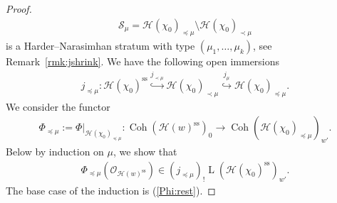 \documentclass[11pt,oneside,a4paper,mathscr]{amsart}
\theoremstyle{definition}
\newcommand{\LL}{\operatorname{L}}
\newcommand{\cH}{\mathcal{H}}
\newcommand{\Coh}{\operatorname{Coh}}
\begin{document}
\begin{proof}
\begin{align*}
    \mathcal{S}_{\mu}=\cH(\chi_0)_{\preceq \mu}\setminus \cH(\chi_0)_{\prec \mu}
\end{align*}
is a Harder--Narasimhan stratum with type $(\mu_1, \ldots, \mu_k)$, see Remark~\ref{rmk:jshrink}. 
We have the following open immersions 
\begin{align*}
j_{\preceq \mu}\colon 
    \cH(\chi_0)^{\mathrm{ss}} \stackrel{j_{\prec \mu}}{\hookrightarrow}
\cH(\chi_0)_{\prec\mu} \stackrel{j_{\mu}}{\hookrightarrow}
\cH(\chi_0)_{\preceq \mu}.
\end{align*}
We consider the functor 
\begin{align}\label{PhiTmu}
    \Phi_{\preceq \mu}:=\Phi|_{\cH(\chi_0)_{\preceq \mu}} \colon 
    \Coh(\cH(w)^{\mathrm{ss}})_0 \to \Coh(\cH(\chi_0)_{\preceq \mu})_{w'}.
\end{align}
Below by induction on $\mu$, we show that 
\begin{align}\label{induct:mu}
\Phi_{\preceq \mu}(\mathcal{O}_{\cH(w)^{\mathrm{ss}}})
\in (j_{\preceq \mu})_{!}\LL(\cH(\chi_0)^{\mathrm{ss}})_{w'}.
\end{align}
The base case of the induction is (\ref{Phi:rest}). 


\end{proof}
\end{document}
